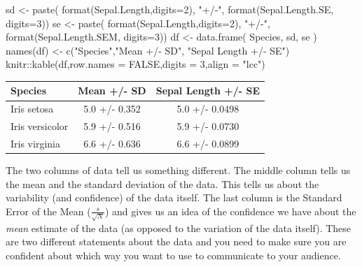 \documentclass[
  letterpaper,
]{book}
\newenvironment{Shaded}{\begin{snugshade}}{\end{snugshade}}
\newcommand{\AttributeTok}[1]{\textcolor[rgb]{0.40,0.45,0.13}{#1}}
\newcommand{\ConstantTok}[1]{\textcolor[rgb]{0.56,0.35,0.01}{#1}}
\newcommand{\DecValTok}[1]{\textcolor[rgb]{0.68,0.00,0.00}{#1}}
\newcommand{\FunctionTok}[1]{\textcolor[rgb]{0.28,0.35,0.67}{#1}}
\newcommand{\NormalTok}[1]{\textcolor[rgb]{0.00,0.23,0.31}{#1}}
\newcommand{\OtherTok}[1]{\textcolor[rgb]{0.00,0.23,0.31}{#1}}
\newcommand{\SpecialCharTok}[1]{\textcolor[rgb]{0.37,0.37,0.37}{#1}}
\newcommand{\StringTok}[1]{\textcolor[rgb]{0.13,0.47,0.30}{#1}}
\newcounter{none} %
\begin{document}
\begin{Shaded}
\begin{Highlighting}[]
\NormalTok{sd }\OtherTok{\textless{}{-}} \FunctionTok{paste}\NormalTok{( }\FunctionTok{format}\NormalTok{(Sepal.Length,}\AttributeTok{digits=}\DecValTok{2}\NormalTok{), }\StringTok{"+/{-}"}\NormalTok{, }\FunctionTok{format}\NormalTok{(Sepal.Length.SE, }\AttributeTok{digits=}\DecValTok{3}\NormalTok{))}
\NormalTok{se }\OtherTok{\textless{}{-}} \FunctionTok{paste}\NormalTok{( }\FunctionTok{format}\NormalTok{(Sepal.Length,}\AttributeTok{digits=}\DecValTok{2}\NormalTok{), }\StringTok{"+/{-}"}\NormalTok{, }\FunctionTok{format}\NormalTok{(Sepal.Length.SEM, }\AttributeTok{digits=}\DecValTok{3}\NormalTok{))}
\NormalTok{df }\OtherTok{\textless{}{-}} \FunctionTok{data.frame}\NormalTok{( Species, sd, se )}
\FunctionTok{names}\NormalTok{(df) }\OtherTok{\textless{}{-}} \FunctionTok{c}\NormalTok{(}\StringTok{"Species"}\NormalTok{,}\StringTok{"Mean +/{-} SD"}\NormalTok{, }\StringTok{"Sepal Length +/{-} SE"}\NormalTok{)}
\NormalTok{knitr}\SpecialCharTok{::}\FunctionTok{kable}\NormalTok{(df,}\AttributeTok{row.names =} \ConstantTok{FALSE}\NormalTok{,}\AttributeTok{digits =} \DecValTok{3}\NormalTok{,}\AttributeTok{align =} \StringTok{"lcc"}\NormalTok{)}
\end{Highlighting}
\end{Shaded}

{\def\LTcaptype{none} %
\begin{longtable}[]{@{}lcc@{}}
\toprule\noalign{}
Species & Mean +/- SD & Sepal Length +/- SE \\
\midrule\noalign{}
\endhead
\bottomrule\noalign{}
\endlastfoot
Iris setosa & 5.0 +/- 0.352 & 5.0 +/- 0.0498 \\
Iris versicolor & 5.9 +/- 0.516 & 5.9 +/- 0.0730 \\
Iris virginia & 6.6 +/- 0.636 & 6.6 +/- 0.0899 \\
\end{longtable}
}

The two columns of data tell us something different. The middle column
tells us the mean and the standard deviation of the data. This tells us
about the variability (and confidence) of the data itself. The last
column is the Standard Error of the Mean (\(\frac{s}{\sqrt{N}}\)) and
gives us an idea of the confidence we have about the \emph{mean}
estimate of the data (as opposed to the variation of the data itself).
These are two different statements about the data and you need to make
sure you are confident about which way you want to use to communicate to
your audience.
\end{document}

